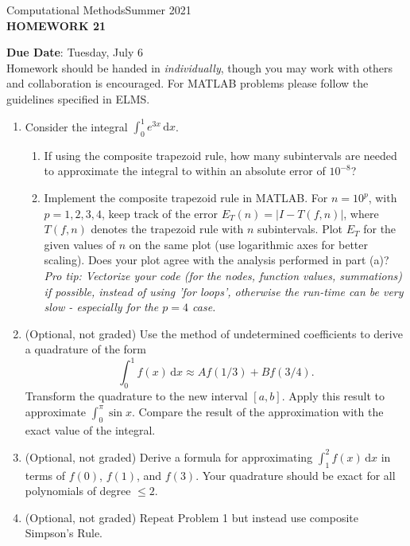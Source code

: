 \documentclass[12pt]{article}
\begin{document}
\begin{center}
Computational Methods\qquad Summer 2021
\\

\textbf{\large HOMEWORK 21}\\
\end{center}
\noindent \textbf{Due Date}: Tuesday, July 6\\

\noindent Homework should be handed in \emph{individually}, though you may work with others and collaboration is encouraged. For MATLAB problems please follow the guidelines specified in ELMS.

\begin{enumerate}
\item Consider the integral $\displaystyle{\int_0^1\! e^{3x}\,\mathrm{d}x}$. 
	\begin{enumerate}
	\item If using the composite trapezoid rule, how many subintervals are needed to approximate the integral to within an absolute error of $10^{-8}$?
	\item Implement the composite trapezoid rule in MATLAB. For $n = 10^p$, with $p=1,2,3,4$, keep track of the error $E_T(n) = |I-T(f,n)|$, where $T(f,n)$ denotes the trapezoid rule with $n$ subintervals. Plot $E_T$ for the given values of $n$ on the same plot (use logarithmic axes for better scaling). Does your plot agree with the analysis performed in part (a)? \\
	
	\emph{Pro tip: Vectorize your code (for the nodes, function values, summations) if possible, instead of using 'for loops', otherwise the run-time can be very slow - especially for the $p=4$ case.}
	\end{enumerate}
\item (Optional, not graded) Use the method of undetermined coefficients to derive a quadrature of the form
	\[\int_0^1\!f(x)\,\mathrm{d}x\approx Af(1/3)+Bf(3/4).\]
Transform the quadrature to the new interval $[a,b]$. Apply this result to approximate $\displaystyle{\int_0^{\pi}\sin{x}}$. Compare the result of the approximation with the exact value of the integral.
\item (Optional, not graded) Derive a formula for approximating $\displaystyle{\int_1^2\!f(x)\,\mathrm{d}x}$ in terms of $f(0)$, $f(1)$, and $f(3)$. Your quadrature should be exact for all polynomials of degree $\le 2$.
\item (Optional, not graded) Repeat Problem 1 but instead use composite Simpson's Rule.
\end{enumerate}
\end{document}
